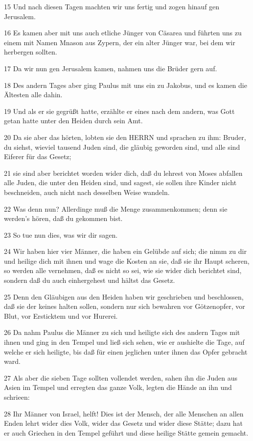 \par 15 Und nach diesen Tagen machten wir uns fertig und zogen hinauf gen Jerusalem.
\par 16 Es kamen aber mit uns auch etliche Jünger von Cäsarea und führten uns zu einem mit Namen Mnason aus Zypern, der ein alter Jünger war, bei dem wir herbergen sollten.
\par 17 Da wir nun gen Jerusalem kamen, nahmen uns die Brüder gern auf.
\par 18 Des andern Tages aber ging Paulus mit uns ein zu Jakobus, und es kamen die Ältesten alle dahin.
\par 19 Und als er sie gegrüßt hatte, erzählte er eines nach dem andern, was Gott getan hatte unter den Heiden durch sein Amt.
\par 20 Da sie aber das hörten, lobten sie den HERRN und sprachen zu ihm: Bruder, du siehst, wieviel tausend Juden sind, die gläubig geworden sind, und alle sind Eiferer für das Gesetz;
\par 21 sie sind aber berichtet worden wider dich, daß du lehrest von Moses abfallen alle Juden, die unter den Heiden sind, und sagest, sie sollen ihre Kinder nicht beschneiden, auch nicht nach desselben Weise wandeln.
\par 22 Was denn nun? Allerdinge muß die Menge zusammenkommen; denn sie werden's hören, daß du gekommen bist.
\par 23 So tue nun dies, was wir dir sagen.
\par 24 Wir haben hier vier Männer, die haben ein Gelübde auf sich; die nimm zu dir und heilige dich mit ihnen und wage die Kosten an sie, daß sie ihr Haupt scheren, so werden alle vernehmen, daß es nicht so sei, wie sie wider dich berichtet sind, sondern daß du auch einhergehest und hältst das Gesetz.
\par 25 Denn den Gläubigen aus den Heiden haben wir geschrieben und beschlossen, daß sie der keines halten sollen, sondern nur sich bewahren vor Götzenopfer, vor Blut, vor Ersticktem und vor Hurerei.
\par 26 Da nahm Paulus die Männer zu sich und heiligte sich des andern Tages mit ihnen und ging in den Tempel und ließ sich sehen, wie er aushielte die Tage, auf welche er sich heiligte, bis daß für einen jeglichen unter ihnen das Opfer gebracht ward.
\par 27 Als aber die sieben Tage sollten vollendet werden, sahen ihn die Juden aus Asien im Tempel und erregten das ganze Volk, legten die Hände an ihn und schrieen:
\par 28 Ihr Männer von Israel, helft! Dies ist der Mensch, der alle Menschen an allen Enden lehrt wider dies Volk, wider das Gesetz und wider diese Stätte; dazu hat er auch Griechen in den Tempel geführt und diese heilige Stätte gemein gemacht.
